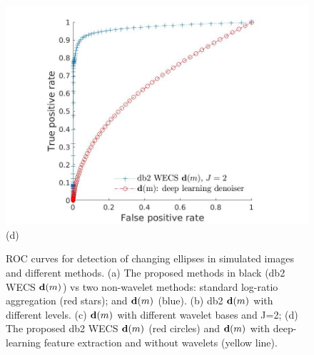 \documentclass[journal]{IEEEtran}
\newcommand{\vd}{{\textbf d}}
\begin{document}
\begin{figure}[htp!]
\includegraphics[scale=.13]{../../figs/dm_comparison_wavelet_deepL}\hspace{-.5cm}(d) \\
\caption{ROC curves for detection of changing ellipses in simulated images and different methods. (a) The proposed methods in black (db2 WECS $\vd(m)$) vs two non-wavelet methods: standard log-ratio aggregation (red stars); and $\vd(m)$ (blue).
(b) db2 $\vd(m)$ with different levels.
(c) $\vd(m)$ with different wavelet bases and J=2;
(d) The proposed db2 WECS $\vd(m)$ (red circles) and $\vd(m)$ with deep-learning feature extraction and without wavelets (yellow line).}
\label{F:EllipsoidChanges_details}
\end{figure}
\end{document}
